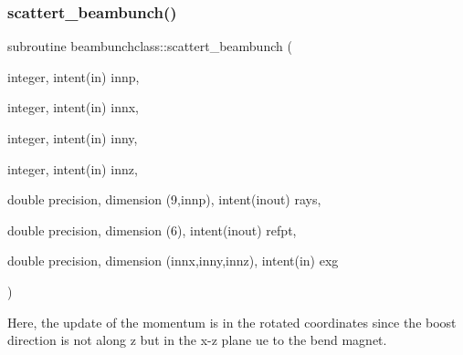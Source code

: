 \subsubsection{\texorpdfstring{scattert\_beambunch()}{scattert\_beambunch()}}
{\footnotesize\ttfamily subroutine beambunchclass\+::scattert\+\_\+beambunch (\begin{DoxyParamCaption}\item[{integer, intent(in)}]{innp,  }\item[{integer, intent(in)}]{innx,  }\item[{integer, intent(in)}]{inny,  }\item[{integer, intent(in)}]{innz,  }\item[{double precision, dimension (9,innp), intent(inout)}]{rays,  }\item[{double precision, dimension (6), intent(inout)}]{refpt,  }\item[{double precision, dimension (innx,inny,innz), intent(in)}]{exg }\end{DoxyParamCaption})}



Here, the update of the momentum is in the rotated coordinates since the boost direction is not along z but in the x-\/z plane ue to the bend magnet. 

